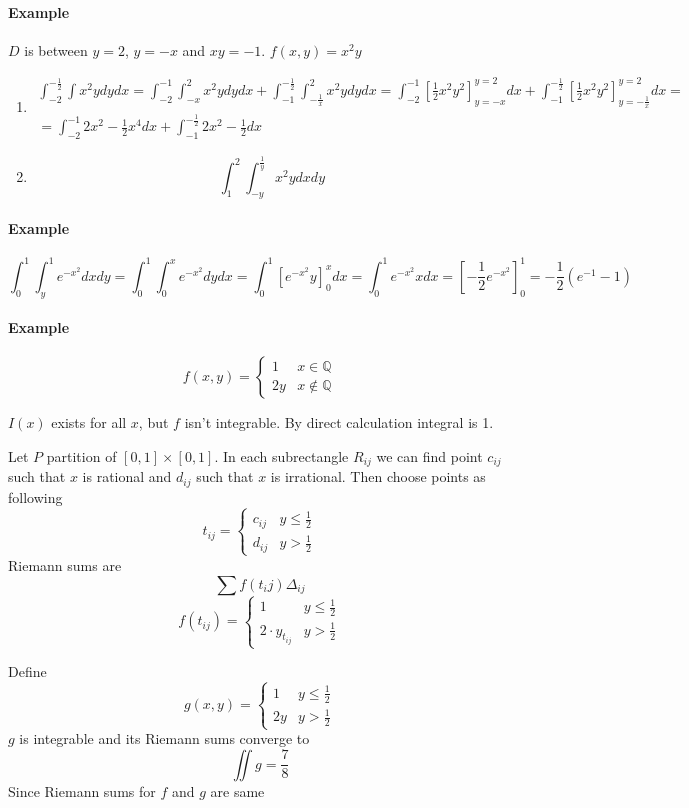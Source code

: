 \paragraph{Example}
$D$ is between $y=2$, $y=-x$ and $xy=-1$.
$f(x,y) = x^2y$
\begin{enumerate}
	\item \begin{align*}
	\int_{-2}^{-\frac{1}{2}} \int x^2y dydx = \int_{-2}^{-1} \int_{-x}^2 x^2y dydx + \int_{-1}^{-\frac{1}{2}} \int_{-\frac{1}{x}}^2 x^2y dydx = \int_{-2}^{-1} \left[\frac{1}{2}x^2y^2\right]_{y=-x}^{y=2} dx + \int_{-1}^{-\frac{1}{2}} \left[\frac{1}{2}x^2y^2\right]_{y=-\frac{1}{x}}^{y=2} dx =\\= \int_{-2}^{-1} 2x^2 - \frac{1}{2}x^4 dx + \int_{-1}^{-\frac{1}{2}}  2x^2 - \frac{1}{2} dx
	\end{align*}
	\item $$\int_{1}^{2} \int_{-y}^{\frac{1}{y}} x^2y dxdy $$
\end{enumerate}
\paragraph{Example}
$$\int_0^1 \int_y^1 e^{-x^2} dx dy = \int_0^1 \int_0^x e^{-x^2} dydx = \int_0^1 \left[e^{-x^2}y\right]_0^x dx = \int_0^1 e^{-x^2}x dx = \left[ -\frac{1}{2}e^{-x^2}\right]_0^1 = -\frac{1}{2}\left(e^{-1}-1\right) $$
\paragraph{Example}
$$f(x,y) = \begin{cases}
1&x\in \mathbb{Q}\\2y&x\not\in \mathbb{Q}
\end{cases}$$

$I(x)$ exists for all $x$, but $f$ isn't integrable. By direct calculation integral is 1.

Let $P$ partition of $[0,1]\times [0,1]$. In each subrectangle $R_{ij}$ we can find point $c_{ij}$ such that $x$ is rational and $d_{ij}$ such that $x$ is irrational. Then choose points as following
$$t_{ij} = \begin{cases}
c_{ij}&y\leq \frac{1}{2}\\
d_{ij}&y>\frac{1}{2}
\end{cases}$$
Riemann sums are
$$\sum f(t_ij)\Delta_{ij}$$
$$f(t_{ij}) = \begin{cases}
1&y\leq \frac{1}{2}\\
2\cdot y_{t_{ij}}&y> \frac{1}{2}
\end{cases}$$

Define
$$g(x,y) = \begin{cases}
1&y\leq \frac{1}{2}\\2y&y>\frac{1}{2}
\end{cases}$$
$g$ is integrable and its Riemann sums converge to $$\iint g = \frac{7}{8}$$
Since Riemann sums for $f$ and $g$ are same